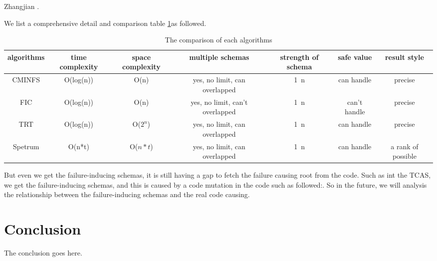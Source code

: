 \documentclass[10pt,journal,cspaper,compsoc]{IEEEtran}
\begin{document}
Zhangjian \cite{zhang2012faulty}.

We list a comprehensive detail and comparison table \ref{comparison-metrics}as followed.

\begin{table}\renewcommand{\arraystretch}{1.3}
  \caption{The comparison of each algorithms} \centering
  \label{comparison-metrics}
  \begin{tabular}{c|c|c|c|c|c|c}\hline
  \hline
  \bfseries algorithms & \bfseries time complexity  & \bfseries space complexity & \bfseries multiple schemas & \bfseries strength of schema & \bfseries safe value & \bfseries result style \\
  \hline
    CMINFS & O(log(n)) & O(n) & yes, no limit, can overlapped & 1~n & can handle & precise \\
  \hline
    FIC & O(log(n)) & O(n) & yes, no limit, can't overlapped & 1~n & can't handle & precise \\
    TRT & O(log(n)) & O($2^n$) & yes, no limit, can overlapped & 1~n & can handle &precise \\
    Spetrum & O(n*t) & O($n*t$) & yes, no limit, can overlapped & 1~n & can handle & a rank of possible \\
  \hline
  \end{tabular}

\end{table}

But even we get the failure-inducing schemas, it is still having a gap to fetch the failure causing root from the code. Such as int the TCAS, we get the failure-inducing schemas, and this is caused by a code mutation in the code such as followed:.  So in the future, we will analysis the relationship between the failure-inducing schemas and the real code causing.


\section{Conclusion}\label{sec:conclusion}
The conclusion goes here.





\end{document}
